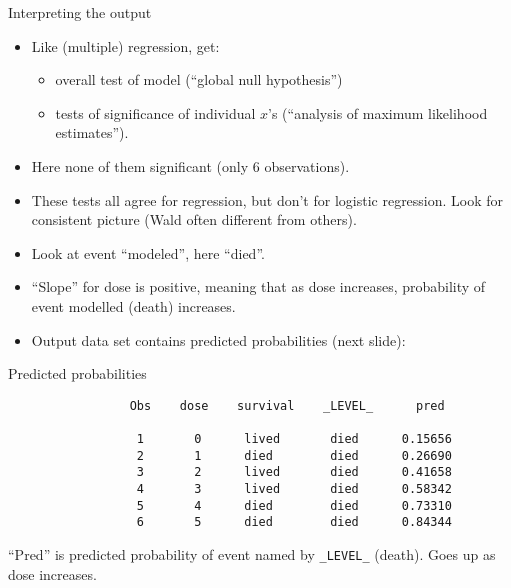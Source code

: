 \documentclass[pdf]{prosper}
\begin{document}
\begin{slide}{Interpreting the output}
  \begin{itemize}
  \item Like (multiple) regression, get:
    \begin{itemize}
    \item overall test of model (``global null hypothesis'')
    \item tests of significance of individual $x$'s (``analysis of
      maximum likelihood estimates'').
    \end{itemize}
  \item     Here none of them significant (only 6 observations).
  \item These tests all agree for regression, but don't for logistic regression. Look for consistent picture (Wald often different from others).
  \item Look at event ``modeled'', here ``died''.
  \item ``Slope'' for dose is positive, meaning that as dose increases, probability of event modelled (death) increases.
  \item Output data set contains predicted probabilities (next slide):
\end{itemize}

\end{slide}

\begin{slide}{Predicted probabilities}

{\scriptsize
\begin{verbatim}
                 Obs    dose    survival    _LEVEL_      pred

                  1       0      lived       died      0.15656
                  2       1      died        died      0.26690
                  3       2      lived       died      0.41658
                  4       3      lived       died      0.58342
                  5       4      died        died      0.73310
                  6       5      died        died      0.84344
\end{verbatim}
}

\vspace{3ex}

``Pred'' is predicted probability of event named by \verb-_LEVEL_- (death). Goes up as dose increases.
  
\end{slide}
\end{document}
